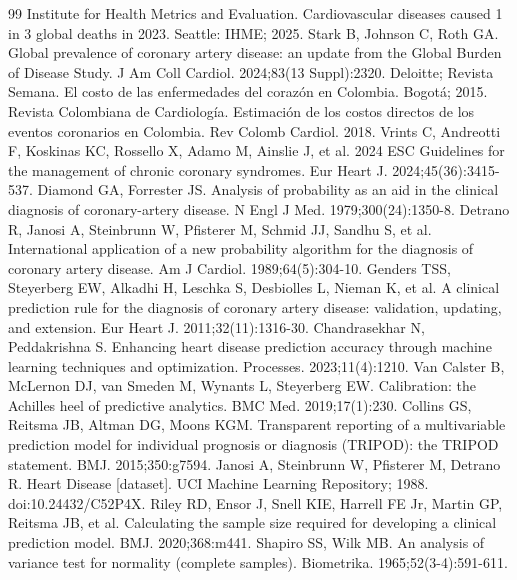 \documentclass[twocolumn,10pt]{article}
\begin{document}
\begin{thebibliography}{99}
\small
{} Institute for Health Metrics and Evaluation. Cardiovascular diseases caused 1 in 3 global deaths in 2023. Seattle: IHME; 2025.
 Stark B, Johnson C, Roth GA. Global prevalence of coronary artery disease: an update from the Global Burden of Disease Study. J Am Coll Cardiol. 2024;83(13 Suppl):2320.
 Deloitte; Revista Semana. El costo de las enfermedades del coraz\'on en Colombia. Bogot\'a; 2015.
 Revista Colombiana de Cardiolog\'ia. Estimaci\'on de los costos directos de los eventos coronarios en Colombia. Rev Colomb Cardiol. 2018.
 Vrints C, Andreotti F, Koskinas KC, Rossello X, Adamo M, Ainslie J, et al. 2024 ESC Guidelines for the management of chronic coronary syndromes. Eur Heart J. 2024;45(36):3415-537.
 Diamond GA, Forrester JS. Analysis of probability as an aid in the clinical diagnosis of coronary-artery disease. N Engl J Med. 1979;300(24):1350-8.
 Detrano R, Janosi A, Steinbrunn W, Pfisterer M, Schmid JJ, Sandhu S, et al. International application of a new probability algorithm for the diagnosis of coronary artery disease. Am J Cardiol. 1989;64(5):304-10.
 Genders TSS, Steyerberg EW, Alkadhi H, Leschka S, Desbiolles L, Nieman K, et al. A clinical prediction rule for the diagnosis of coronary artery disease: validation, updating, and extension. Eur Heart J. 2011;32(11):1316-30.
 Chandrasekhar N, Peddakrishna S. Enhancing heart disease prediction accuracy through machine learning techniques and optimization. Processes. 2023;11(4):1210.
 Van Calster B, McLernon DJ, van Smeden M, Wynants L, Steyerberg EW. Calibration: the Achilles heel of predictive analytics. BMC Med. 2019;17(1):230.
 Collins GS, Reitsma JB, Altman DG, Moons KGM. Transparent reporting of a multivariable prediction model for individual prognosis or diagnosis (TRIPOD): the TRIPOD statement. BMJ. 2015;350:g7594.
 Janosi A, Steinbrunn W, Pfisterer M, Detrano R. Heart Disease [dataset]. UCI Machine Learning Repository; 1988. doi:10.24432/C52P4X.
 Riley RD, Ensor J, Snell KIE, Harrell FE Jr, Martin GP, Reitsma JB, et al. Calculating the sample size required for developing a clinical prediction model. BMJ. 2020;368:m441.
 Shapiro SS, Wilk MB. An analysis of variance test for normality (complete samples). Biometrika. 1965;52(3-4):591-611.

\end{thebibliography}
\end{document}
